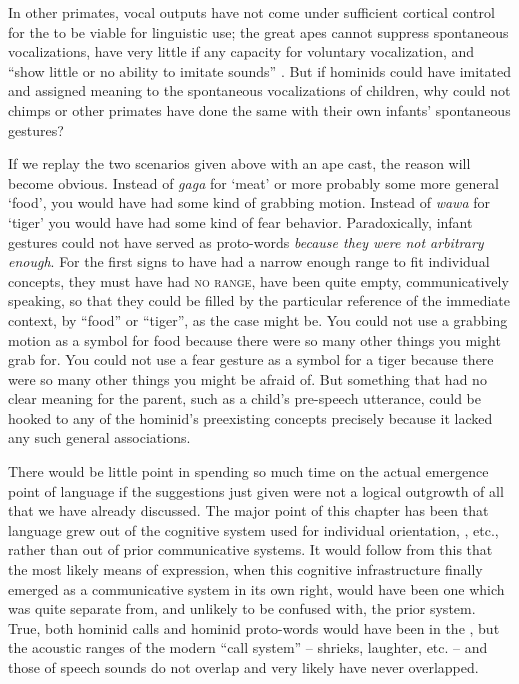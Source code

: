 In other primates, vocal outputs have not come under sufficient cortical control for the  to be viable for linguistic use; the great apes cannot suppress spontaneous vocalizations, have very little if any capacity for voluntary vocalization, and ``show little or no ability to imitate sounds'' \citep{Dingwall1979}. But if hominids could have imitated and assigned meaning to the spontaneous vocalizations of children, why could not chimps or other primates have done the same with their own infants' spontaneous gestures?


If we replay the two scenarios given above with an ape cast, the reason will become obvious. Instead of \textit{gaga} for `meat' or more probably some more general `food', you would have had some kind of grabbing motion. Instead of \textit{wawa} for `tiger' you would have had some kind of fear behavior. Paradoxically, infant gestures could not have served as proto-words \textit{because they were not arbitrary enough}. For the first signs to have had a narrow enough range to fit individual concepts, they must have had \textsc{no range}, have been quite empty, communicatively speaking, so that they could be filled by the particular reference of the immediate context, by ``food'' or ``tiger'', as the case might be. You could not use a grabbing motion as a symbol for food because there were so many other things you might grab for. You could not use a fear gesture as a symbol for a tiger because there were so many other things you might be afraid of. But something that had no clear meaning for the parent, such as a child's pre-speech utterance, could be hooked to any of the hominid's preexisting concepts precisely because it lacked any such general associations.

There would be little point in spending so much time on the actual emergence point of language if the suggestions just given were not a logical outgrowth of all that we have already discussed. The major point of this chapter has been that language grew out of the cognitive system used for individual orientation, , etc., rather than out of prior communicative systems. It would follow from this that the most likely means of expression, when this cognitive infrastructure finally emerged as a communicative system in its own right, would have been one which was quite separate from, and unlikely to be confused with, the prior system. True, both hominid calls and hominid proto-words would have been in the , but the acoustic ranges of the modern ``call system'' -- shrieks, laughter, etc. -- and those of speech sounds do not overlap and very likely have never overlapped.

